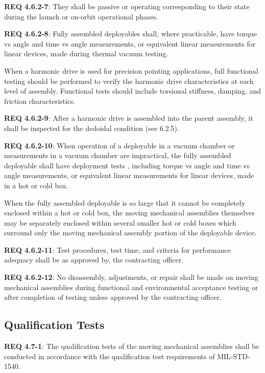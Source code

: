 \documentclass[12pt]{article}
\begin{document}
\noindent \textbf{REQ 4.6.2-7}: They shall be passive or operating corresponding to their state during the launch or on-orbit operational phases.

\noindent \textbf{REQ 4.6.2-8}: Fully assembled deployables shall, where practicable, have torque vs angle and time vs angle measurements, or equivalent linear measurements for linear devices, made during thermal vacuum testing. 

When a harmonic drive is used for precision pointing applications, full functional testing should be performed to verify the harmonic drive characteristics at each level of assembly. 
Functional tests should include torsional stiffness, damping, and friction characteristics. 

\noindent \textbf{REQ 4.6.2-9}: After a harmonic drive is assembled into the parent assembly, it shall be inspected for the dedoidal condition (see 6.2.5). 

\noindent \textbf{REQ 4.6.2-10}: When operation of a deployable in a vacuum chamber or measurements in a vacuum chamber are impractical, the fully assembled deployable shall have deployment tests , including torque vs angle and time vs angle measurements, or equivalent linear measurements for linear devices, made in a hot or cold box. 

When the fully assembled deployable is so large that it cannot be completely enclosed within a hot or cold box, the moving mechanical assemblies themselves may be separately enclosed within several smaller hot or cold boxes which surround only the moving mechanical assembly portion of the deployable device. 

\noindent \textbf{REQ 4.6.2-11}: Test procedures, test time, and criteria for performance adequacy shall be as approved by, the contracting officer. 

\noindent \textbf{REQ 4.6.2-12}: No disassembly, adjustments, or repair shall be made on moving mechanical assemblies during functional and environmental acceptance testing or after completion of testing unless approved by the contracting officer.


\subsection{Qualification Tests} %
\noindent \textbf{REQ 4.7-1}: The qualification tests of the moving mechanical assemblies shall be conducted in accordance with the qualification test requirements of MIL-STD-1540. 
\end{document}
